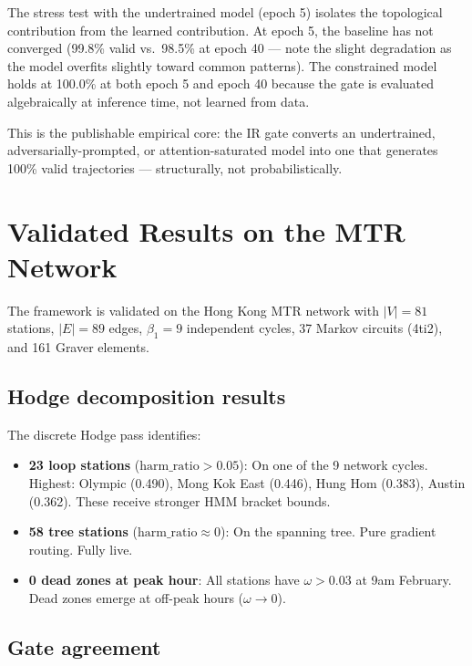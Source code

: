 \documentclass[11pt,a4paper]{article}
\begin{document}
The stress test with the undertrained model (epoch 5) isolates
the topological contribution from the learned contribution.
At epoch 5, the baseline has not converged (99.8\% valid vs.\ 98.5\%
at epoch 40 — note the slight degradation as the model overfits
slightly toward common patterns).
The constrained model holds at 100.0\% at both epoch 5 and epoch 40
because the gate is evaluated algebraically at inference time,
not learned from data.

This is the publishable empirical core: the IR gate converts an
undertrained, adversarially-prompted, or attention-saturated model
into one that generates 100\% valid trajectories --- structurally,
not probabilistically.

\section{Validated Results on the MTR Network}

The framework is validated on the Hong Kong MTR network with
$|V| = 81$ stations, $|E| = 89$ edges, $\beta_1 = 9$ independent
cycles, 37 Markov circuits (4ti2), and 161 Graver elements.

\subsection{Hodge decomposition results}

The discrete Hodge pass identifies:
\begin{itemize}
  \item \textbf{23 loop stations} ($\mathrm{harm\_ratio} > 0.05$):
        On one of the 9 network cycles. Highest: Olympic (0.490),
        Mong Kok East (0.446), Hung Hom (0.383), Austin (0.362).
        These receive stronger HMM bracket bounds.
  \item \textbf{58 tree stations} ($\mathrm{harm\_ratio} \approx 0$):
        On the spanning tree. Pure gradient routing. Fully live.
  \item \textbf{0 dead zones at peak hour}: All stations have
        $\omega > 0.03$ at 9am February. Dead zones emerge
        at off-peak hours ($\omega \to 0$).
\end{itemize}

\subsection{Gate agreement}
\end{document}
